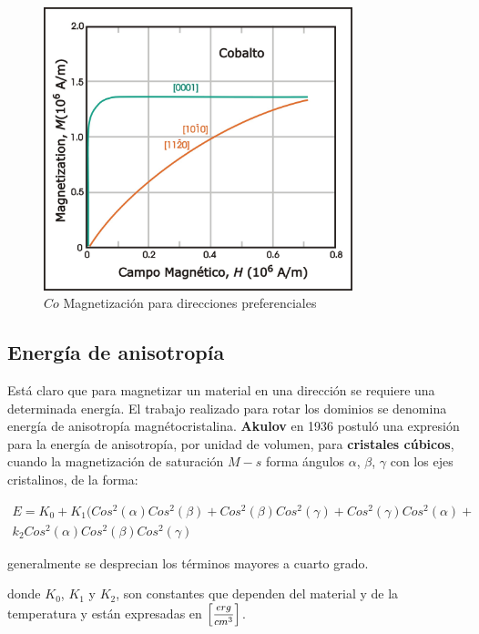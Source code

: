 \begin{figure}[H]
    \centering
    \includegraphics[width=0.8\textwidth]{./Figures/MagneticAnisotropy1}
	\caption{$Co$ Magnetización para direcciones preferenciales}
	\label{fig:MagneticAnisotropy1}
\end{figure}


\subsection{Energía de anisotropía}

Está claro que para magnetizar un material en una dirección se requiere una determinada energía. El trabajo realizado para rotar los dominios se denomina energía de anisotropía magnétocristalina.
\textbf{Akulov} en 1936 postuló una expresión para la energía de anisotropía, por unidad de volumen, para \textbf{cristales cúbicos}, cuando la magnetización de saturación $M-{s}$ forma ángulos $\alpha$, $\beta$, $\gamma$  con los ejes cristalinos, de la forma:


\begin{multline}
E=K_{0}+K_{1}(Cos^{2}(\alpha)Cos^{2}(\beta)+Cos^{2}(\beta)Cos^{2}(\gamma)+Cos^{2}(\gamma)Cos^{2}(\alpha)+ \\
k_{2}Cos^{2}(\alpha)Cos^{2}(\beta)Cos^{2}(\gamma)
\end{multline}

generalmente se desprecian los términos mayores a cuarto grado.

donde $K_{0}$, $K_{1}$ y $K_{2}$, son constantes que dependen del material y de la temperatura y están expresadas en ${\left[ \mfrac{erg}{cm^{3}}\right] }$. 

